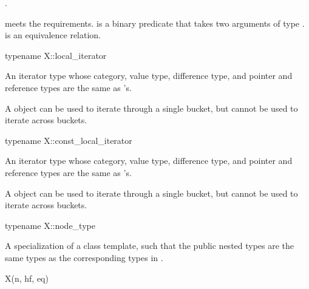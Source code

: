 \begin{itemdescr}
\pnum
\result
{}.

\pnum
\expects
{} meets the  requirements.
 is a binary predicate that takes two arguments of type .
 is an equivalence relation.
\end{itemdescr}

%
\begin{itemdecl}
typename X::local_iterator
\end{itemdecl}

\begin{itemdescr}
\pnum
\result
An iterator type
whose category, value type, difference type, and pointer and reference types
are the same as 's.
\begin{note}
A  object can be used to iterate through a single bucket,
but cannot be used to iterate across buckets.
\end{note}
\end{itemdescr}

%
\begin{itemdecl}
typename X::const_local_iterator
\end{itemdecl}

\begin{itemdescr}
\pnum
\result
An iterator type
whose category, value type, difference type, and pointer and reference types
are the same as 's.
\begin{note}
A  object can be used to iterate
through a single bucket,
but cannot be used to iterate across buckets.
\end{note}
\end{itemdescr}

%
\begin{itemdecl}
typename X::node_type
\end{itemdecl}

\begin{itemdescr}
\pnum
\result
A specialization of a  class template,
such that the public nested types are the same types
as the corresponding types in .
\end{itemdescr}

%
%
%
%
\begin{itemdecl}
X(n, hf, eq)
\end{itemdecl}

